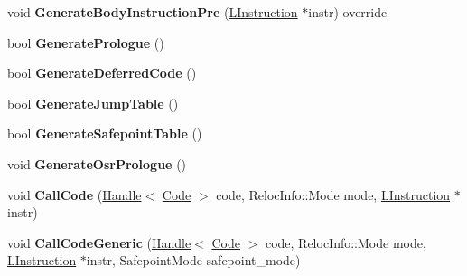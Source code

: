 \begin{DoxyCompactItemize}
\item 
void {\bfseries Generate\+Body\+Instruction\+Pre} (\hyperlink{classv8_1_1internal_1_1_l_instruction}{L\+Instruction} $\ast$instr) override\hypertarget{classv8_1_1internal_1_1_l_code_gen_a85d4251ce8010cd6b04358d6f54e1d13}{}\label{classv8_1_1internal_1_1_l_code_gen_a85d4251ce8010cd6b04358d6f54e1d13}

\item 
bool {\bfseries Generate\+Prologue} ()\hypertarget{classv8_1_1internal_1_1_l_code_gen_aff05496f75e5706dc01028ef21cd2065}{}\label{classv8_1_1internal_1_1_l_code_gen_aff05496f75e5706dc01028ef21cd2065}

\item 
bool {\bfseries Generate\+Deferred\+Code} ()\hypertarget{classv8_1_1internal_1_1_l_code_gen_a7edbe3129e1ff758f4c3d471d6038aee}{}\label{classv8_1_1internal_1_1_l_code_gen_a7edbe3129e1ff758f4c3d471d6038aee}

\item 
bool {\bfseries Generate\+Jump\+Table} ()\hypertarget{classv8_1_1internal_1_1_l_code_gen_af066f353885f2f3cec35f74445989328}{}\label{classv8_1_1internal_1_1_l_code_gen_af066f353885f2f3cec35f74445989328}

\item 
bool {\bfseries Generate\+Safepoint\+Table} ()\hypertarget{classv8_1_1internal_1_1_l_code_gen_aa8cc24b1134b87ea8ce0a9a5c5688b5a}{}\label{classv8_1_1internal_1_1_l_code_gen_aa8cc24b1134b87ea8ce0a9a5c5688b5a}

\item 
void {\bfseries Generate\+Osr\+Prologue} ()\hypertarget{classv8_1_1internal_1_1_l_code_gen_a911d24be4ac4e392d736d9769b7ebb8f}{}\label{classv8_1_1internal_1_1_l_code_gen_a911d24be4ac4e392d736d9769b7ebb8f}

\item 
void {\bfseries Call\+Code} (\hyperlink{classv8_1_1internal_1_1_handle}{Handle}$<$ \hyperlink{classv8_1_1internal_1_1_code}{Code} $>$ code, Reloc\+Info\+::\+Mode mode, \hyperlink{classv8_1_1internal_1_1_l_instruction}{L\+Instruction} $\ast$instr)\hypertarget{classv8_1_1internal_1_1_l_code_gen_aca293066a99024759f94b995c6ba5ce5}{}\label{classv8_1_1internal_1_1_l_code_gen_aca293066a99024759f94b995c6ba5ce5}

\item 
void {\bfseries Call\+Code\+Generic} (\hyperlink{classv8_1_1internal_1_1_handle}{Handle}$<$ \hyperlink{classv8_1_1internal_1_1_code}{Code} $>$ code, Reloc\+Info\+::\+Mode mode, \hyperlink{classv8_1_1internal_1_1_l_instruction}{L\+Instruction} $\ast$instr, Safepoint\+Mode safepoint\+\_\+mode)\hypertarget{classv8_1_1internal_1_1_l_code_gen_a902e149712841134b7a31a866542b477}{}\label{classv8_1_1internal_1_1_l_code_gen_a902e149712841134b7a31a866542b477}


\end{DoxyCompactItemize}
